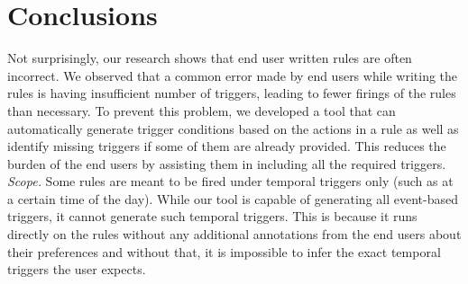 \documentclass{sig-alternate-05-2015}
\begin{document}
\section{Conclusions}
Not surprisingly, our research shows that end user written rules are often incorrect. We observed that a common error made by end users while writing the rules is having insufficient number of triggers, leading to fewer firings of the rules than necessary. To prevent this problem, we developed a tool that can automatically generate trigger conditions based on the actions in a rule as well as identify missing triggers if some of them are already provided. This reduces the burden of the end users by assisting them in including all the required triggers. \\
\emph{Scope.} Some rules are meant to be fired under temporal triggers only (such as at a certain time of the day). While our tool is capable of generating all event-based triggers, it cannot generate such temporal triggers. This is because it runs directly on the rules without any additional annotations from the end users about their preferences and without that, it is impossible to infer the exact temporal triggers the user expects. 


  
\end{document}
